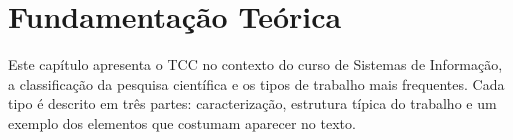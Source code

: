 \chapter{Fundamentação Teórica}
\label{cap2_fundamentacao}

%

Este capítulo apresenta o TCC no contexto do curso de Sistemas de Informação, a classificação da pesquisa científica e os tipos de trabalho mais frequentes. Cada tipo é descrito em três partes: caracterização, estrutura típica do trabalho e um exemplo dos elementos que costumam aparecer no texto.










